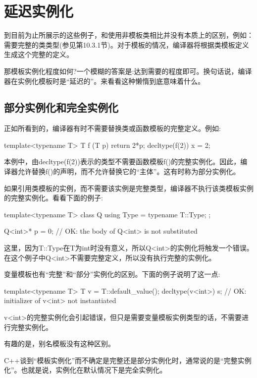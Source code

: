 \section{延迟实例化}

到目前为止所展示的这些例子，和使用非模板类相比并没有本质上的区别，例如：需要完整的类类型(参见第10.3.1节)。对于模板的情况，编译器将根据类模板定义生成这个完整的定义。

那模板实例化程度如何?一个模糊的答案是:达到需要的程度即可。换句话说，编译器在实例化模板时是“延迟的”。来看看这种懒惰到底意味着什么。

\subsection{部分实例化和完全实例化}

正如所看到的，编译器有时不需要替换类或函数模板的完整定义。例如:

\begin{cpp}
template<typename T> T f (T p) { return 2*p; }
decltype(f(2)) x = 2;
\end{cpp}

本例中，由decltype(f(2))表示的类型不需要函数模板f()的完整实例化。因此，编译器允许替换f()的声明，而不允许替换它的“主体”。这有时称为部分实例化。

如果引用类模板的实例，而不需要该实例是完整类型，编译器不执行该类模板实例的完整实例化。看看下面的例子:

\begin{cpp}
template<typename T> class Q {
	using Type = typename T::Type;
};

Q<int>* p = 0; // OK: the body of Q<int> is not substituted
\end{cpp}

这里，因为T::Type在T为int时没有意义，所以Q<int>的实例化将触发一个错误。在这个例子中Q<int>不需要完整定义，所以没有执行完整的实例化。

变量模板也有“完整”和“部分”实例化的区别。下面的例子说明了这一点:

\begin{cpp}
template<typename T> T v = T::default_value();
decltype(v<int>) s; // OK: initializer of v<int> not instantiated
\end{cpp}

v<int>的完整实例化会引起错误，但只是需要变量模板实例类型的话，不需要进行完整实例化。

有趣的是，别名模板没有这种区别。

C++谈到“模板实例化”而不确定是完整还是部分实例化时，通常说的是“完整实例化”。也就是说，实例化在默认情况下是完全实例化。

